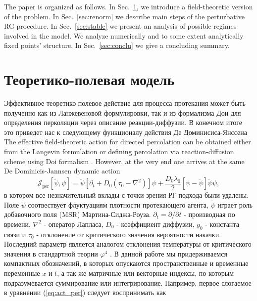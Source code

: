 \documentclass[12pt]{article}
\def\J{\mathcal{J}}
\begin{document}
The paper is organized as follows. In 
 Sec.~\ref{sec:model}, we introduce a
field-theoretic version of the problem. In Sec.~\ref{sec:renorm} we 
 describe main steps of the
 perturbative RG procedure. In Sec.~\ref{sec:stable} we present an 
 analysis of possible regimes involved in the model. 
 We analyze numerically
 and to some extent analytically  fixed points' structure.
 In Sec.~\ref{sec:conclu} we give a concluding summary. 
{\section{Теоретико-полевая модель} \label{sec:model}}
Эффективное теоретико-полевое действие \cite{JanTau04} для процесса протекания может быть полученно как из Ланжевеновой формулировки, так и из формализма Дои \cite{Doi} для определения перколяции через описание реакции-диффузии.
В конечном итоге это приведет нас к следующему функционалу действия Де Доминисиса-Янссена \cite{Janssen76,deDom76,Janssen79}
The effective field-theoretic action \cite{JanTau04} for directed percolation can be obtained
either from the Langevin formulation or defining percolation via reaction-diffusion 
scheme using Doi formalism \cite{Doi}. However, at the very end one arrives at
 the same De Dominicis-Jannsen dynamic action \cite{Janssen76,deDom76,Janssen79}
\begin{equation}
  \J_{ \text{per}}[\tilde{\psi},\psi] =  
  \tilde{\psi}[
  \partial_t + D_0(\tau_0 -\nabla^2)
  ]\psi  + 
   \frac{D_0\lambda_0}{2} [\psi-\tilde{\psi}]\tilde{\psi}\psi,
  \label{eq:act_per}
\end{equation}
в котором все незначительный вклады с точки зрения РГ подхода были удалены.
Поле $\psi$ соотвествует флуктуациям плотности протекающего агента, $\tilde{\psi}$ играет роль добавочного поля (MSR) Мартина-Сиджа-Роуза. 
$\partial_t = \partial / \partial t$ - производная по времени, $\nabla^2$ - оператор Лапласа, $D_0$ - коэффициент диффузии, $g_0$ - константа связи и $\tau_0$ - отклонение от критического значения вероятности накачки.
Последний параметр является аналогом отклонения температуры от критического значения в стандартной теории $\varphi^4$ \cite{JanTau04,Zinn}.
В данной работе мы придерживаемся компактных обозначений, в которых опускаются пространственные и временные переменные $x$ и $t$, а так же матричные или векторные индексы, по которым подразумевается суммирование или интегрирование.
Например, первое слогаемое в уравнении (\ref{eq:act_per}) следует воспринимать как
\end{document}
